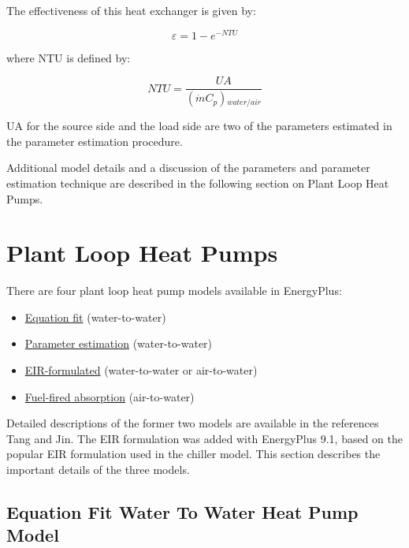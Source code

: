 The effectiveness of this heat exchanger is given by:

\begin{equation}
\varepsilon  = 1 - {e^{ - NTU}}
\end{equation}

where NTU is defined by:

\begin{equation}
NTU = \frac{{UA}}{{(\dot mC{}_p){}_{water/air}}}
\end{equation}

UA for the source side and the load side are two of the parameters estimated in the parameter estimation procedure.

Additional model details and a discussion of the parameters and parameter estimation technique are described in the following section on Plant Loop Heat Pumps.

\section{Plant Loop Heat Pumps}\label{plant-loop-heat-pumps}

There are four plant loop heat pump models available in EnergyPlus:

\begin{itemize}
  \item \hyperref[equation-fit-water-to-water-heat-pump-model]{Equation fit} (water-to-water)
  \item \hyperref[parameter-estimation-water-to-water-heat-pump-model]{Parameter estimation} (water-to-water)
  \item \hyperref[eir-plant-loop-heat-pump-model]{EIR-formulated} (water-to-water or air-to-water)
  \item \hyperref[fuel-fired-air-to-water-heat-pumps]{Fuel-fired absorption} (air-to-water)
\end{itemize}

Detailed descriptions of the former two models are available in the references Tang and Jin.  The EIR formulation was added with EnergyPlus 9.1, based on the popular EIR formulation used in the chiller model.  This section describes the important details of the three models.

\subsection{Equation Fit Water To Water Heat Pump Model}\label{equation-fit-water-to-water-heat-pump-model}


